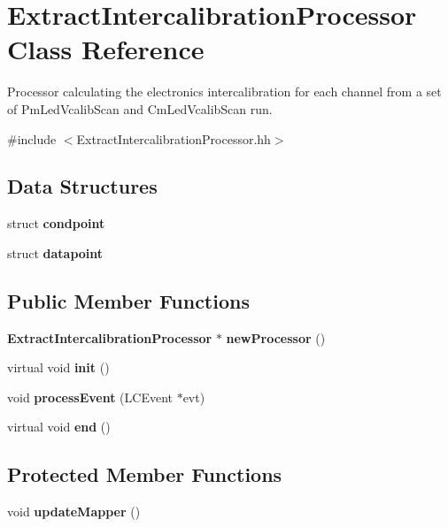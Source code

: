 \section{ExtractIntercalibrationProcessor Class Reference}
\label{classExtractIntercalibrationProcessor}


Processor calculating the electronics intercalibration for each channel from a set of PmLedVcalibScan and CmLedVcalibScan run.  


{\ttfamily \#include $<$ExtractIntercalibrationProcessor.hh$>$}\subsection*{Data Structures}
\begin{DoxyCompactItemize}
\item 
struct {\bf condpoint}
\item 
struct {\bf datapoint}
\end{DoxyCompactItemize}
\subsection*{Public Member Functions}
\begin{DoxyCompactItemize}
\item 
{\bf ExtractIntercalibrationProcessor} $\ast$ {\bfseries newProcessor} ()\label{classExtractIntercalibrationProcessor_af7b829330fe9a3a4700f2ff35d754c2f}

\item 
virtual void {\bfseries init} ()\label{classExtractIntercalibrationProcessor_a88dbc7b44c2dd7185efba4803f75fa6f}

\item 
void {\bfseries processEvent} (LCEvent $\ast$evt)\label{classExtractIntercalibrationProcessor_a8b9b3ce7a22525ea1fb8e56e780aa166}

\item 
virtual void {\bfseries end} ()\label{classExtractIntercalibrationProcessor_aa8cae07229f1d96ba57f17bd2aa9a9eb}

\end{DoxyCompactItemize}
\subsection*{Protected Member Functions}
\begin{DoxyCompactItemize}
\item 
void {\bfseries updateMapper} ()\label{classExtractIntercalibrationProcessor_a032a69f48b6fc244f50a521036c0e70f}

\end{DoxyCompactItemize}
